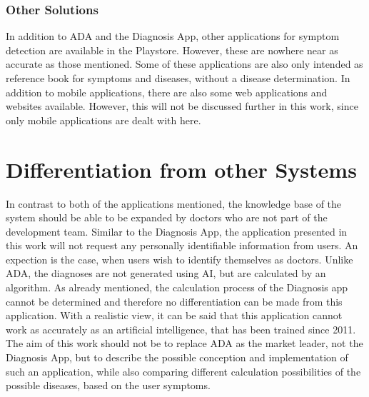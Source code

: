 \subsubsection{Other Solutions}
In addition to ADA and the Diagnosis App, other applications for symptom detection are available in the Playstore. However, these are nowhere near as accurate as those mentioned. Some of these applications are also only intended as reference book for symptoms and diseases, without a disease determination. In addition to mobile applications, there are also some web applications and websites available. However, this will not be discussed further in this work, since only mobile applications are dealt with here.

\section{Differentiation from other Systems}
In contrast to both of the applications mentioned, the knowledge base of the system should be able to be expanded by doctors who are not part of the development team. Similar to the Diagnosis App, the application presented in this work will not request any personally identifiable information from users. An expection is the case, when users wish to identify themselves as doctors. Unlike ADA, the diagnoses are not generated using AI, but are calculated by an algorithm. As already mentioned, the calculation process of the Diagnosis app cannot be determined and therefore no differentiation can be made from this application. With a realistic view, it can be said that this application cannot work as accurately as an artificial intelligence, that has been trained since 2011.  The aim of this work should not be to replace ADA as the market leader, not the Diagnosis App, but to describe the possible conception and implementation of such an application, while also comparing different calculation possibilities of the possible diseases, based on the user symptoms.




